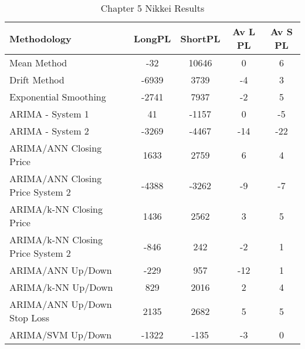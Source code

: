 \begin{table}[ht]
\centering
\caption[Chapter 5 Nikkei Results]{Chapter 5 Nikkei Results} 
\label{tab:chp6:nik2_summary}
\begin{tabular}{lcccc}
  \toprule Methodology & LongPL & ShortPL & Av L PL & Av S PL \\ 
  \midrule Mean Method & -32 & 10646 & 0 & 6 \\ 
  Drift Method & -6939 & 3739 & -4 & 3 \\ 
  Exponential Smoothing & -2741 & 7937 & -2 & 5 \\ 
  ARIMA - System 1 & 41 & -1157 & 0 & -5 \\ 
  ARIMA - System 2 & -3269 & -4467 & -14 & -22 \\ 
  ARIMA/ANN Closing Price & 1633 & 2759 & 6 & 4 \\ 
  ARIMA/ANN Closing Price System 2 & -4388 & -3262 & -9 & -7 \\ 
  ARIMA/k-NN Closing Price & 1436 & 2562 & 3 & 5 \\ 
  ARIMA/k-NN Closing Price System 2 & -846 & 242 & -2 & 1 \\ 
  ARIMA/ANN Up/Down & -229 & 957 & -12 & 1 \\ 
  ARIMA/k-NN Up/Down & 829 & 2016 & 2 & 4 \\ 
  ARIMA/ANN Up/Down Stop Loss & 2135 & 2682 & 5 & 5 \\ 
  ARIMA/SVM Up/Down & -1322 & -135 & -3 & 0 \\ 
   \bottomrule \end{tabular}
\end{table}

